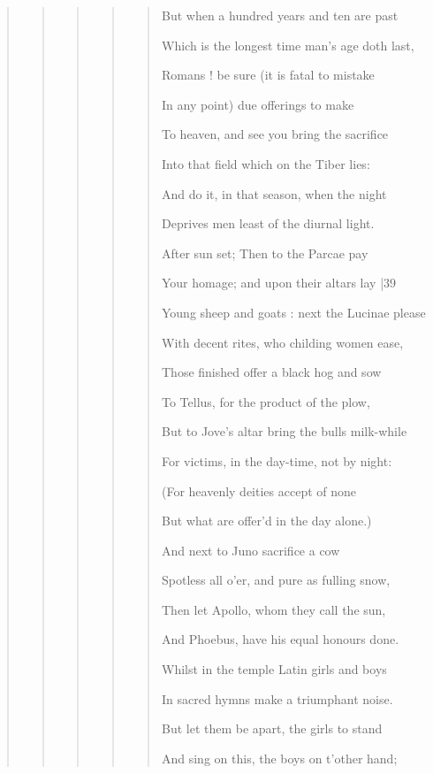 \begin{quote}

\begin{quote}

\begin{quote}

\begin{quote}

\begin{quote}

But when a hundred years and ten are past 

Which is the longest time man's age doth last, 

Romans ! be sure (it is fatal to mistake 

In any point) due offerings to make 

To heaven, and see you bring the sacrifice 

Into that field which on the Tiber lies: 

And do it, in that season, when the night 

Deprives men least of the diurnal light. 

After sun set; Then to the Parcae pay 

Your homage; and upon their altars lay |39 

Young sheep and goats : next the Lucinae please

With decent rites, who childing women ease,

Those finished offer a black hog and sow

To Tellus, for the product of the plow,

But to Jove's altar bring the bulls milk-while

For victims, in the day-time, not by night:

(For heavenly deities accept of none

But what are offer'd in the day alone.)

And next to Juno sacrifice a cow

Spotless all o'er, and pure as fulling snow,

Then let Apollo, whom they call the sun,

And Phoebus, have his equal honours done.

Whilst in the temple Latin girls and boys

In sacred hymns make a triumphant noise.

But let them be apart, the girls to stand

And sing on this, the boys on t'other hand;


\end{quote}
\end{quote}
\end{quote}
\end{quote}
\end{quote}
